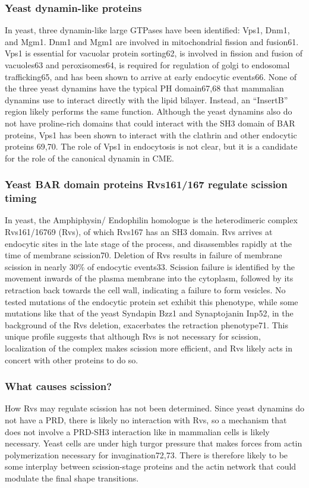 		\subsubsection{Yeast dynamin-like proteins}
		In yeast, three dynamin-like large GTPases have been identified: Vps1, Dnm1, and Mgm1. Dnm1 and Mgm1 are involved in mitochondrial fission and fusion61. Vps1 is essential for vacuolar protein sorting62, is involved in fission and fusion of vacuoles63 and peroxisomes64, is required for regulation of golgi to endosomal trafficking65, and has been shown to arrive at early endocytic events66. None of the three yeast dynamins have the typical PH domain67,68 that mammalian dynamins use to interact directly with the lipid bilayer. Instead, an “InsertB” region likely performs the same function. Although the yeast dynamins also do not have proline-rich domains that could interact with the SH3 domain of BAR proteins, Vps1 has been shown to interact with the clathrin and other endocytic proteins 69,70. The role of Vps1 in endocytosis is not clear, but it is a candidate for the role of the canonical dynamin in CME.

		\subsubsection{Yeast BAR domain proteins Rvs161/167 regulate scission timing}
		In yeast, the Amphiphysin/ Endophilin homologue is the heterodimeric complex Rvs161/16769 (Rvs), of which Rvs167 has an SH3 domain. Rvs arrives at endocytic sites in the late stage of the process, and disassembles rapidly at the time of membrane scission70. Deletion of Rvs results in failure of membrane scission in nearly 30\% of endocytic events33. Scission failure is identified by the movement inwards of the plasma membrane into the cytoplasm, followed by its retraction back towards the cell wall, indicating a failure to form vesicles. No tested mutations of the endocytic protein set exhibit this phenotype, while some mutations like that of the yeast Syndapin Bzz1 and Synaptojanin Inp52, in the background of the Rvs deletion, exacerbates the retraction phenotype71. This unique profile suggests that although Rvs is not necessary for scission, localization of the complex makes scission more efficient, and Rvs likely acts in concert with other proteins to do so. 

		\subsubsection{What causes scission?}
		How Rvs may regulate scission has not been determined. Since yeast dynamins do not have a PRD, there is likely no interaction with Rvs, so a mechanism that does not involve a PRD-SH3 interaction like in mammalian cells is likely necessary. Yeast cells are under high turgor pressure that makes forces from actin polymerization necessary for invagination72,73. There is therefore likely to be some interplay between scission-stage proteins and the actin network that could modulate the final shape transitions. 
		
